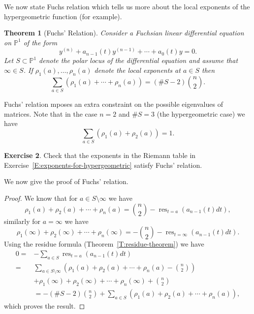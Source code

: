 \documentclass[12pt]{book}
\numberwithin{equation}{section}
\newtheorem{theorem}{Theorem}[subsection]
\theoremstyle{definition}
\newtheorem{exercise}[theorem]{Exercise}
\theoremstyle{remark}
\newcommand{\PP}{\mathbb{P}}
\newcommand{\res}{\operatorname{res}}
\begin{document}
We now state Fuchs relation which tells us more about the local exponents of the hypergeometric function (for example).
\begin{theorem}[Fuchs' Relation]\label{T:fuchs-relation}
Consider a Fuchsian linear differential equation on $\PP^1$ of the form 
$$ y^{(n)} + a_{n-1}(t) y^{(n-1)} + \cdots + a_0(t) y =0.$$
Let $S \subset \PP^1$ denote the polar locus of the differential equation and assume that $\infty \in S$. 
If $\rho_1(a),\ldots,\rho_n(a)$ denote the local exponents at $a \in S$ then
$$ \sum_{a\in S} \left( \rho_1(a) + \cdots + \rho_n(a) \right) = (\#S-2){n \choose 2}.$$	
\end{theorem}

Fuchs' relation mposes an extra constraint on the possible eigenvalues of matrices. 
Note that in the case $n=2$ and $\# S=3$ (the hypergeometric case) we have 
$$ \sum_{a\in S}\left( \rho_1(a) + \rho_2(a) \right) =1.$$
\begin{exercise}
	Check that the exponents in the Riemann table in Exercise~\ref{E:exponents-for-hypergeometric} satisfy Fuchs' relation.
\end{exercise} 
We now give the proof of Fuchs' relation.

\begin{proof}
	We know that for $a \in S\setminus \infty$ we have 
	 $$ \rho_1(a) + \rho_2(a) + \cdots + \rho_n(a) = {n \choose 2} - \res_{t=a}(a_{n-1}(t)dt), $$
	similarly for $a =\infty$ we have 
	 $$ \rho_1(\infty) + \rho_2(\infty) + \cdots + \rho_n(\infty) = -{n \choose 2} - \res_{t=\infty}(a_{n-1}(t)dt).$$
	Using the residue formula (Theorem~\ref{T:residue-theorem}) we have 
	\begin{align*}
	  0=&- \sum_{a \in S} \res_{t=a}( a_{n-1}(t)dt) \\
	  =& \sum_{a\in S\setminus \infty}\left( \rho_1(a)+\rho_2(a) + \cdots + \rho_n(a) - {n\choose 2} \right) \\
	  & + \rho_1(\infty) + \rho_2(\infty) + \cdots + \rho_n(\infty) + {n \choose 2} \\
	  &= - (\#S -2){n \choose 2} + \sum_{a\in S}\left( \rho_1(a)+\rho_2(a) + \cdots + \rho_n(a) \right), 
	  \end{align*}
	  which proves the result. 
\end{proof}
\end{document}
